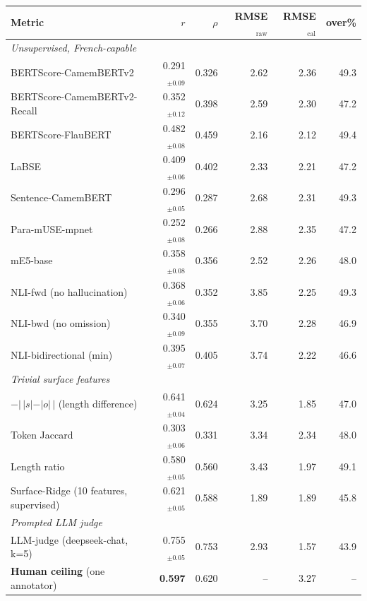 \setlength{\tabcolsep}{4pt}
\begin{tabular}{lrrrrr}
\toprule
Metric & $r$ & $\rho$ & RMSE$_{\text{raw}}$ & RMSE$_{\text{cal}}$ & over\% \\
\midrule
\multicolumn{6}{l}{\emph{Unsupervised, French-capable}}\\
BERTScore-CamemBERTv2 & 0.291$_{\pm0.09}$ & 0.326 & 2.62 & 2.36 & 49.3 \\
BERTScore-CamemBERTv2-Recall & 0.352$_{\pm0.12}$ & 0.398 & 2.59 & 2.30 & 47.2 \\
BERTScore-FlauBERT & 0.482$_{\pm0.08}$ & 0.459 & 2.16 & 2.12 & 49.4 \\
LaBSE & 0.409$_{\pm0.06}$ & 0.402 & 2.33 & 2.21 & 47.2 \\
Sentence-CamemBERT & 0.296$_{\pm0.05}$ & 0.287 & 2.68 & 2.31 & 49.3 \\
Para-mUSE-mpnet & 0.252$_{\pm0.08}$ & 0.266 & 2.88 & 2.35 & 47.2 \\
mE5-base & 0.358$_{\pm0.08}$ & 0.356 & 2.52 & 2.26 & 48.0 \\
NLI-fwd (no hallucination) & 0.368$_{\pm0.06}$ & 0.352 & 3.85 & 2.25 & 49.3 \\
NLI-bwd (no omission) & 0.340$_{\pm0.09}$ & 0.355 & 3.70 & 2.28 & 46.9 \\
NLI-bidirectional (min) & 0.395$_{\pm0.07}$ & 0.405 & 3.74 & 2.22 & 46.6 \\
\midrule
\multicolumn{6}{l}{\emph{Trivial surface features}}\\
$-|\,|s|-|o|\,|$ (length difference) & 0.641$_{\pm0.04}$ & 0.624 & 3.25 & 1.85 & 47.0 \\
Token Jaccard & 0.303$_{\pm0.06}$ & 0.331 & 3.34 & 2.34 & 48.0 \\
Length ratio & 0.580$_{\pm0.05}$ & 0.560 & 3.43 & 1.97 & 49.1 \\
Surface-Ridge (10 features, supervised) & 0.621$_{\pm0.05}$ & 0.588 & 1.89 & 1.89 & 45.8 \\
\midrule
\multicolumn{6}{l}{\emph{Prompted LLM judge}}\\
LLM-judge (deepseek-chat, k=5) & 0.755$_{\pm0.05}$ & 0.753 & 2.93 & 1.57 & 43.9 \\
\midrule
\textbf{Human ceiling} (one annotator) & \textbf{0.597} & 0.620 & -- & 3.27 & -- \\
\bottomrule
\end{tabular}